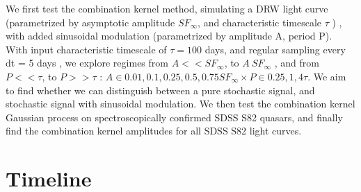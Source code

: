 \documentclass[modern]{aastex62}
\begin{document}
We first test the combination kernel method, simulating a DRW light curve (parametrized by asymptotic amplitude $SF_{\infty}$, and characteristic timescale $\tau$ ) , with  added sinusoidal modulation (parametrized by amplitude A, period P). With input characteristic timescale of $\tau  = 100 $ days, and regular sampling every dt = 5 days  , we explore regimes from $A << SF_{\infty}$,  to $A ~ SF_{\infty}$ , and from $P << \tau$, to $P >> \tau$ :  $A \in { 0.01,  0.1,  0.25,  0.5, 0.75 } SF_{\infty}  \times  P \in { 0.25,  1 ,  4 } \tau  $. We aim to find whether we can distinguish between a pure stochastic signal, and stochastic signal with sinusoidal modulation. We then test the combination kernel Gaussian process on spectroscopically confirmed SDSS S82 quasars, and finally find  the combination kernel amplitudes for all SDSS S82 light curves.


\section{Timeline}




\end{document}
